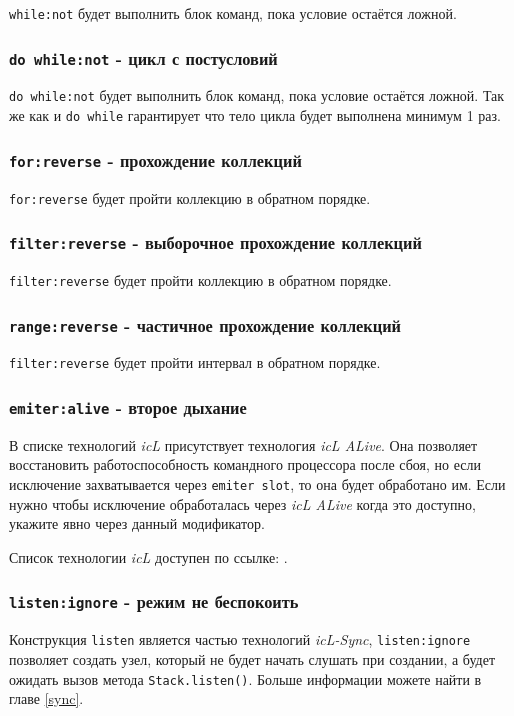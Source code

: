 \texttt{while:not} будет выполнить блок команд, пока условие остаётся ложной.

\subsubsection{\texttt{do while:not} - цикл с постусловий}

\texttt{do while:not} будет выполнить блок команд, пока условие остаётся ложной. Так же как и \texttt{do while} гарантирует что тело цикла будет выполнена минимум 1 раз.

\subsubsection{\texttt{for:reverse} - прохождение коллекций}

\texttt{for:reverse} будет пройти коллекцию в обратном порядке.

\subsubsection{\texttt{filter:reverse} - выборочное прохождение коллекций}

\texttt{filter:reverse} будет пройти коллекцию в обратном порядке.

\subsubsection{\texttt{range:reverse} - частичное прохождение коллекций}

\texttt{filter:reverse} будет пройти интервал в обратном порядке.

\subsubsection{\texttt{emiter:alive} - второе дыхание}

В списке технологий \textit{icL} присутствует технология \textit{icL ALive}. Она позволяет восстановить работоспособность командного процессора после сбоя, но если исключение захватывается через \texttt{emiter slot}, то она будет обработано им. Если нужно чтобы исключение обработалась через \textit{icL ALive} когда это доступно, укажите явно через данный модификатор.

Список технологии \textit{icL} доступен по ссылке: .

\subsubsection{\texttt{listen:ignore} - режим не беспокоить}

Конструкция \texttt{listen} является частью технологий \textit{icL-Sync}, \texttt{listen:ignore} позволяет создать узел, который не будет начать слушать при создании, а будет ожидать вызов метода \texttt{Stack.listen()}. Больше информации можете найти в главе \ref{sync}. 
